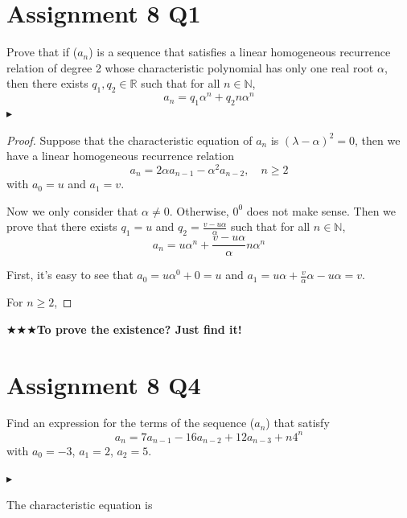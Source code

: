 \section*{Assignment 8 Q1}
Prove that if ($a_n$) is a sequence that satisfies a linear homogeneous recurrence relation of degree 2 whose characteristic polynomial has only one real root $\alpha$, then there exists $q_1, q_2 \in\mathbb{R}$ such that for all $n \in \mathbb{N}$,
$$a_n=q_1\alpha^n+q_2n\alpha^n$$
$\blacktriangleright$ \begin{proof}
    Suppose that the characteristic equation of $a_n$ is $(\lambda-\alpha)^2=0$, then we have a linear homogeneous recurrence relation $$a_n=2\alpha a_{n-1}-\alpha^2a_{n-2},\quad n\geq2$$ with $a_0=u$ and $a_1=v$.
    
    Now we only consider that $\alpha\neq0$. Otherwise, $0^0$ does not make sense. Then we prove that there exists $q_1=u$ and $q_2=\frac{v-u\alpha}{\alpha}$ such that for all $n\in\mathbb{N}$, $$a_n=u\alpha^n+\frac{v-u\alpha}{\alpha}n\alpha^n$$

    First, it's easy to see that $a_0=u\alpha^0+0=u$ and $a_1=u\alpha+\frac{v}{\alpha}\alpha-u\alpha=v$.

    For $n\geq2$,
\end{proof}

$\bigstar\bigstar\bigstar$\textbf{To prove the existence? Just find it!}

\section*{Assignment 8 Q4}
Find an expression for the terms of the sequence ($a_n$) that satisfy $$a_n = 7a_{n-1}-16a_{n-2} + 12a_{n-3} + n4^n$$
with $a_0 = −3$, $a_1 = 2$, $a_2 = 5$.

$\blacktriangleright$

The characteristic equation is

